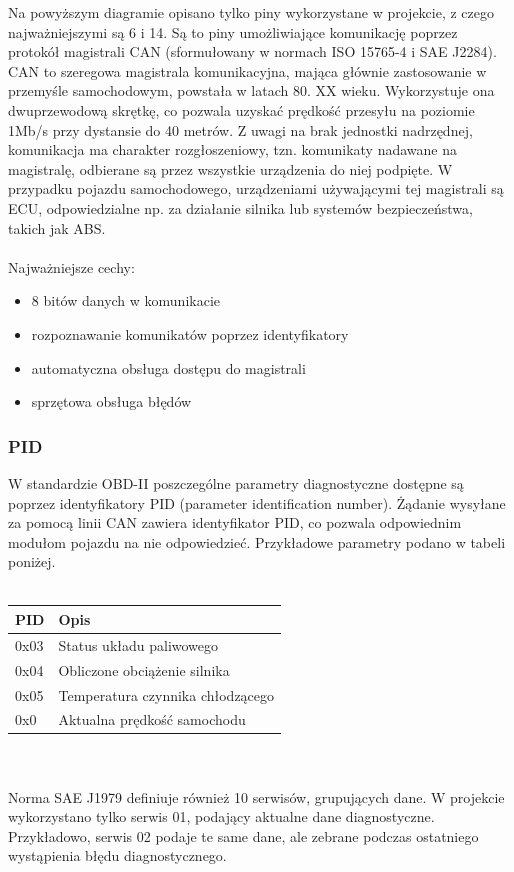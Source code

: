 \documentclass[10pt,a4paper]{article}
\begin{document}
		Na powyższym diagramie opisano tylko piny wykorzystane w projekcie, z czego najważniejszymi są 6 i 14. Są to piny umożliwiające komunikację poprzez protokół magistrali CAN (sformułowany w normach ISO 15765-4 i SAE J2284).\\
		CAN to szeregowa magistrala komunikacyjna, mająca głównie zastosowanie w przemyśle samochodowym, powstała w latach 80. XX wieku. Wykorzystuje ona dwuprzewodową skrętkę, co pozwala uzyskać prędkość przesyłu na poziomie 1Mb/s przy dystansie do 40 metrów. Z uwagi na brak jednostki nadrzędnej, komunikacja ma charakter rozgłoszeniowy, tzn. komunikaty nadawane na magistralę, odbierane są przez wszystkie urządzenia do niej podpięte. W przypadku pojazdu samochodowego, urządzeniami używającymi tej magistrali są ECU, odpowiedzialne np. za działanie silnika lub systemów bezpieczeństwa, takich jak ABS.\\ \\ Najważniejsze cechy:
		\begin{itemize}
			\item 8 bitów danych w komunikacie
			\item rozpoznawanie komunikatów poprzez identyfikatory
			\item automatyczna obsługa dostępu do magistrali
			\item sprzętowa obsługa błędów
		\end{itemize}
		
		\subsubsection{PID}
		W standardzie OBD-II poszczególne parametry diagnostyczne dostępne są poprzez identyfikatory PID (parameter identification number). Żądanie wysyłane za pomocą linii CAN zawiera identyfikator PID, co pozwala odpowiednim modułom pojazdu na nie odpowiedzieć. Przykładowe parametry podano w tabeli poniżej. \\\\
		\begin{tabular}{|l|l|}
			\hline
			PID & Opis \\
			\hline
			0x03 & Status układu paliwowego \\
			\hline
			0x04 & Obliczone obciążenie silnika \\
			\hline
			0x05 & Temperatura czynnika chłodzącego\\			
			\hline
			0x0 & Aktualna prędkość samochodu \\			
			\hline
		\end{tabular}
		\\\\
		Norma SAE J1979 definiuje również 10 serwisów, grupujących dane. W projekcie wykorzystano tylko serwis 01, podający aktualne dane diagnostyczne. Przykładowo, serwis 02 podaje te same dane, ale zebrane podczas ostatniego wystąpienia błędu diagnostycznego.
\end{document}

